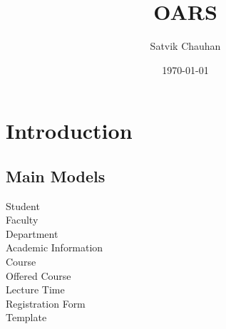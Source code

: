 \documentclass[letterpaper,12pt]{article}
\title{OARS}
\author{Satvik Chauhan}
\date{{\small \today}}
\begin{document}
\maketitle
\section{Introduction}


\subsection{Main Models}
\begin{description}
\item[Student]
\item[Faculty]
\item[Department]
\item[Academic Information]
\item[Course]
\item[Offered Course]
\item[Lecture Time]
\item[Registration Form]
\item[Template]
\end{description}
\end{document}
